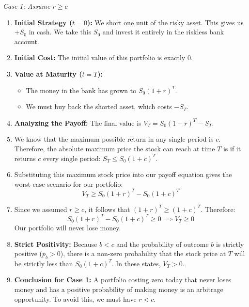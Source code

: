 \vspace{0.5em}
\noindent \textit{Case 1: Assume $r \ge c$}
\begin{enumerate}
    \item \textbf{Initial Strategy ($t=0$):} We short one unit of the risky asset. This gives us $+S_0$ in cash. We take this $S_0$ and invest it entirely in the riskless bank account. 
    \item \textbf{Initial Cost:} The initial value of this portfolio is exactly $0$.
    \item \textbf{Value at Maturity ($t=T$):} 
    \begin{itemize}
        \item The money in the bank has grown to $S_0(1+r)^T$.
        \item We must buy back the shorted asset, which costs $-S_T$.
    \end{itemize}
    \item \textbf{Analyzing the Payoff:} The final value is $V_T = S_0(1+r)^T - S_T$.
    \item We know that the maximum possible return in any single period is $c$. Therefore, the absolute maximum price the stock can reach at time $T$ is if it returns $c$ every single period: $S_T \le S_0(1+c)^T$.
    \item Substituting this maximum stock price into our payoff equation gives the worst-case scenario for our portfolio:
    $$V_T \ge S_0(1+r)^T - S_0(1+c)^T$$
    \item Since we assumed $r \ge c$, it follows that $(1+r)^T \ge (1+c)^T$. Therefore:
    $$S_0(1+r)^T - S_0(1+c)^T \ge 0 \implies V_T \ge 0$$
    Our portfolio will never lose money.
    \item \textbf{Strict Positivity:} Because $b < c$ and the probability of outcome $b$ is strictly positive ($p_b > 0$), there is a non-zero probability that the stock price at $T$ will be strictly less than $S_0(1+c)^T$. In these states, $V_T > 0$.
    \item \textbf{Conclusion for Case 1:} A portfolio costing zero today that never loses money and has a positive probability of making money is an arbitrage opportunity. To avoid this, we must have $r < c$.
\end{enumerate}

